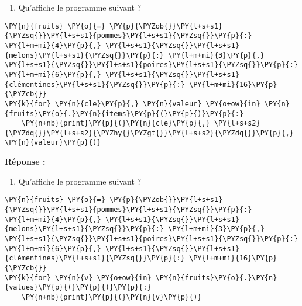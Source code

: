 \documentclass[12pt]{book}
\begin{document}
    \begin{enumerate}
\def\labelenumi{\arabic{enumi}.}
\setcounter{enumi}{1}
\tightlist
\item
  Qu'affiche le programme suivant ?
\end{enumerate}

    \begin{tcolorbox}[breakable, size=fbox, boxrule=1pt, pad at break*=1mm,colback=cellbackground, colframe=cellborder]
\begin{Verbatim}[commandchars=\\\{\}]
\PY{n}{fruits} \PY{o}{=} \PY{p}{\PYZob{}}\PY{l+s+s1}{\PYZsq{}}\PY{l+s+s1}{pommes}\PY{l+s+s1}{\PYZsq{}}\PY{p}{:} \PY{l+m+mi}{4}\PY{p}{,} \PY{l+s+s1}{\PYZsq{}}\PY{l+s+s1}{melons}\PY{l+s+s1}{\PYZsq{}}\PY{p}{:} \PY{l+m+mi}{3}\PY{p}{,} \PY{l+s+s1}{\PYZsq{}}\PY{l+s+s1}{poires}\PY{l+s+s1}{\PYZsq{}}\PY{p}{:} \PY{l+m+mi}{6}\PY{p}{,} \PY{l+s+s1}{\PYZsq{}}\PY{l+s+s1}{clémentines}\PY{l+s+s1}{\PYZsq{}}\PY{p}{:} \PY{l+m+mi}{16}\PY{p}{\PYZcb{}}
\PY{k}{for} \PY{n}{cle}\PY{p}{,} \PY{n}{valeur} \PY{o+ow}{in} \PY{n}{fruits}\PY{o}{.}\PY{n}{items}\PY{p}{(}\PY{p}{)}\PY{p}{:}
    \PY{n+nb}{print}\PY{p}{(}\PY{n}{cle}\PY{p}{,} \PY{l+s+s2}{\PYZdq{}}\PY{l+s+s2}{\PYZhy{}\PYZgt{}}\PY{l+s+s2}{\PYZdq{}}\PY{p}{,} \PY{n}{valeur}\PY{p}{)}
\end{Verbatim}
\end{tcolorbox}

    \textbf{Réponse :}

    \begin{enumerate}
\def\labelenumi{\arabic{enumi}.}
\setcounter{enumi}{2}
\tightlist
\item
  Qu'affiche le programme suivant ?
\end{enumerate}

    \begin{tcolorbox}[breakable, size=fbox, boxrule=1pt, pad at break*=1mm,colback=cellbackground, colframe=cellborder]
\begin{Verbatim}[commandchars=\\\{\}]
\PY{n}{fruits} \PY{o}{=} \PY{p}{\PYZob{}}\PY{l+s+s1}{\PYZsq{}}\PY{l+s+s1}{pommes}\PY{l+s+s1}{\PYZsq{}}\PY{p}{:} \PY{l+m+mi}{4}\PY{p}{,} \PY{l+s+s1}{\PYZsq{}}\PY{l+s+s1}{melons}\PY{l+s+s1}{\PYZsq{}}\PY{p}{:} \PY{l+m+mi}{3}\PY{p}{,} \PY{l+s+s1}{\PYZsq{}}\PY{l+s+s1}{poires}\PY{l+s+s1}{\PYZsq{}}\PY{p}{:} \PY{l+m+mi}{6}\PY{p}{,} \PY{l+s+s1}{\PYZsq{}}\PY{l+s+s1}{clémentines}\PY{l+s+s1}{\PYZsq{}}\PY{p}{:} \PY{l+m+mi}{16}\PY{p}{\PYZcb{}}
\PY{k}{for} \PY{n}{v} \PY{o+ow}{in} \PY{n}{fruits}\PY{o}{.}\PY{n}{values}\PY{p}{(}\PY{p}{)}\PY{p}{:}
    \PY{n+nb}{print}\PY{p}{(}\PY{n}{v}\PY{p}{)}
\end{Verbatim}
\end{tcolorbox}
\end{document}
